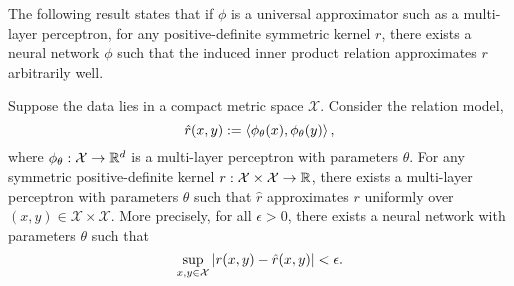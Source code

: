 
The following result states that if $\phi$ is a universal approximator such as a multi-layer perceptron, for any positive-definite symmetric kernel $r$, there exists a neural network $\phi$ such that the induced inner product relation approximates $r$ arbitrarily well.

\begin{theorem}
	\label{theoremm:symmetric_inner_prod_rels_func_class}
	\hphantom{~}

	Suppose the data lies in a compact metric space \(\mathcal{X}\). Consider the relation model,
	\begin{equation*}
		\hat{r}(x, y) := \left \langle \phi_{\theta}(x), \phi_{\theta}(y) \right\rangle,
	\end{equation*}
	where $\phi_{\theta}: {\mathcal{X}} \to \mathbb{R}^d$ is a multi-layer perceptron with parameters $\theta$.
	For any symmetric positive-definite kernel $r: {\mathcal{X}} \times {\mathcal{X}} \to \mathbb{R}$, there exists a multi-layer perceptron with parameters $\theta$ such that $\hat{r}$ approximates $r$ uniformly over \((x,y) \in \mathcal{X}\times\mathcal{X}\). More precisely, for all \(\epsilon > 0\), there exists a neural network with parameters $\theta$ such that
    \[\sup_{x,y \in \mathcal{X}}{\left\lvert r(x,y) - \hat{r}(x,y)\right\rvert} < \epsilon.\]
\end{theorem}

